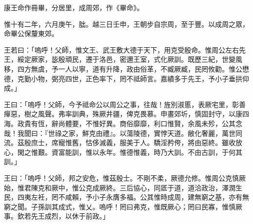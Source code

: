 
\begin{pinyinscope}
康王命作冊畢，分居里，成周郊，作《畢命》。

惟十有二年，六月庚午，朏。越三日壬申，王朝步自宗周，至于豐。以成周之眾，命畢公保釐東郊。

王若曰：「嗚呼！父師，惟文王、武王敷大德于天下，用克受殷命。惟周公左右先王，綏定厥家，毖殷頑民，遷于洛邑，密邇王室，式化厥訓。既歷三紀，世變風移，四方無虞，予一人以寧，道有升降，政由俗革，不臧厥臧，民罔攸勸。惟公懋德，克勤小物，弼亮四世，正色率下，罔不祗師言。嘉績多于先王，予小子垂拱仰成。」

王曰：「嗚呼！父師，今予祗命公以周公之事，往哉！旌別淑慝，表厥宅里，彰善癉惡，樹之風聲。弗率訓典，殊厥井疆，俾克畏慕。申畫郊圻，慎固封守，以康四海。政貴有恆，辭尚體要，不惟好異。商俗靡靡，利口惟賢，余風未殄，公其念哉！我聞曰：『世祿之家，鮮克由禮』。以蕩陵德，實悖天道。敝化奢麗，萬世同流。茲殷庶士，席寵惟舊，怙侈滅義，服美于人。驕淫矜侉，將由惡終。雖收放心，閑之惟艱。資富能訓，惟以永年。惟德惟義，時乃大訓。不由古訓，于何其訓。」

王曰：「嗚呼！父師，邦之安危，惟茲殷士。不剛不柔，厥德允修。惟周公克慎厥始，惟君陳克和厥中，惟公克成厥終。三后協心，同厎于道，道洽政治，澤潤生民，四夷左衽，罔不咸賴，予小子永膺多福。公其惟時成周，建無窮之基，亦有無窮之聞。子孫訓其成式，惟乂。嗚呼！罔曰弗克，惟既厥心；罔曰民寡，惟慎厥事。欽若先王成烈，以休于前政。」


\end{pinyinscope}